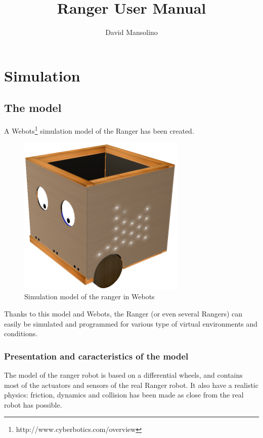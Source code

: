 \documentclass[a4paper,11pt]{report}
\title{Ranger User Manual}
\author{David Mansolino}
\begin{document}
\maketitle
\tableofcontents







\part{Simulation}
\chapter{The model}
A Webots\footnote{http://www.cyberbotics.com/overview} simulation model of the Ranger has been created.\\

\begin{figure}[H]
  \begin{center}
    \includegraphics[width=8cm]{simulation_model.png}
    \caption{Simulation model of the ranger in Webots}
    \label{fig:simulation_model}
  \end{center}
\end{figure}

Thanks to this model and Webots, the Ranger (or even several Rangers) can easily be simulated and programmed for various type of virtual environments and conditions.\\

\section{Presentation and caracteristics of the model}
The model of the ranger robot is based on a differential wheels, and contains most of the actuators and sensors of the real Ranger robot. It also have a realistic physics: friction, dynamics and collision has been made as close from the real robot has possible.\\
\end{document}

